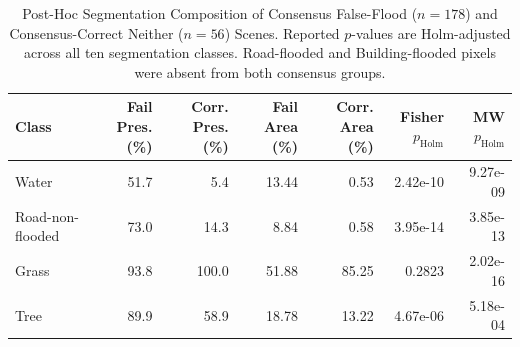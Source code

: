 
\begin{table}[t]
\centering
\caption{Post-Hoc Segmentation Composition of Consensus
False-Flood ($n=178$) and Consensus-Correct Neither ($n=56$)
Scenes. Reported $p$-values are Holm-adjusted across all ten
segmentation classes. Road-flooded and Building-flooded pixels
were absent from both consensus groups.}
\label{tab:segmentation_shortcut}
\footnotesize
\setlength{\tabcolsep}{4pt}
\begin{tabular}{lrrrrrr}
\hline
Class &
Fail Pres. (\%) &
Corr. Pres. (\%) &
Fail Area (\%) &
Corr. Area (\%) &
Fisher $p_{\mathrm{Holm}}$ &
MW $p_{\mathrm{Holm}}$ \\
\hline
Water & 51.7 & 5.4 & 13.44 & 0.53 & 2.42e-10 & 9.27e-09 \\
Road-non-flooded & 73.0 & 14.3 & 8.84 & 0.58 & 3.95e-14 & 3.85e-13 \\
Grass & 93.8 & 100.0 & 51.88 & 85.25 & 0.2823 & 2.02e-16 \\
Tree & 89.9 & 58.9 & 18.78 & 13.22 & 4.67e-06 & 5.18e-04 \\
\hline
\end{tabular}
\end{table}
